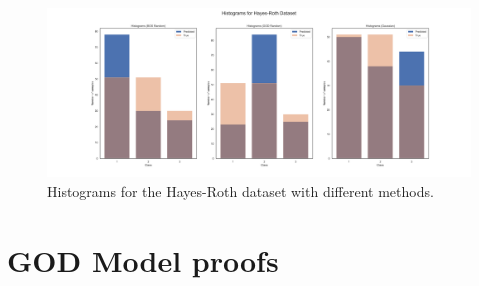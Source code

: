 \documentclass[a4paper,12pt]{article}
\begin{document}
\begin{figure}[H]
    \centering
    \includegraphics[width=\linewidth]{Attachments/histograms_hayes-roth.png}
    \caption{Histograms for the Hayes-Roth dataset with different methods.}
    \label{fig:hist_hr}
\end{figure}

\section{GOD Model proofs}
\label{appendix:god}


\end{document}
